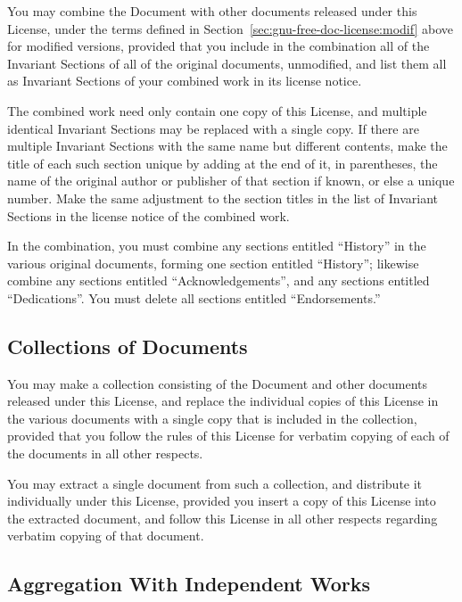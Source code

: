 \documentclass[11pt,a4paper,oneside]{alb-corp}
\begin{document}
You may combine the Document with other documents released under this
License, under the terms defined in
Section~\ref{sec:gnu-free-doc-license:modif} above for modified
versions, provided that you include in the combination all of the
Invariant Sections of all of the original documents, unmodified, and
list them all as Invariant Sections of your combined work in its license
notice.

The combined work need only contain one copy of this License, and
multiple identical Invariant Sections may be replaced with a single
copy.  If there are multiple Invariant Sections with the same name but
different contents, make the title of each such section unique by adding
at the end of it, in parentheses, the name of the original author or
publisher of that section if known, or else a unique number.  Make the
same adjustment to the section titles in the list of Invariant Sections
in the license notice of the combined work.

In the combination, you must combine any sections entitled ``History''
in the various original documents, forming one section entitled
``History''; likewise combine any sections entitled
``Acknowledgements'', and any sections entitled ``Dedications''.  You
must delete all sections entitled ``Endorsements.''


\subsection{Collections of Documents}
\label{sec:gnu-free-doc-license:coll-docum}

You may make a collection consisting of the Document and other documents
released under this License, and replace the individual copies of this
License in the various documents with a single copy that is included in
the collection, provided that you follow the rules of this License for
verbatim copying of each of the documents in all other respects.

You may extract a single document from such a collection, and distribute
it individually under this License, provided you insert a copy of this
License into the extracted document, and follow this License in all
other respects regarding verbatim copying of that document.


\subsection{Aggregation With Independent Works}
\label{sec:gnu-free-doc-license:aggr-with-indep-works}
\end{document}
